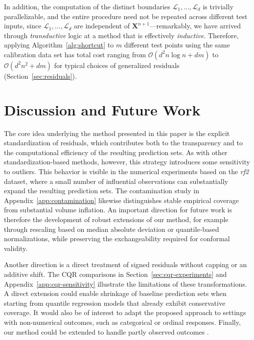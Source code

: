 In addition, the computation of the distinct boundaries $\mathcal{L}_1,\ldots,\mathcal{L}_d$ is trivially parallelizable, and the entire procedure need not be repeated across different test inputs, since $\mathcal{L}_1,\ldots,\mathcal{L}_d$ are independent of $\mathbf{X}^{n+1}$---remarkably, we have arrived through {\em transductive} logic at a method that is effectively {\em inductive}. Therefore, applying Algorithm~\ref{alg:shortcut} to $m$ different test points using the same calibration data set has total cost ranging from $\mathcal{O}(d^2 n \log n + dm)$ to $\mathcal{O}(d^2 n^2 + dm)$ for typical choices of generalized residuals (Section~\ref{sec:residuals}).





\section{Discussion and Future Work}
\label{sec:discussion}

The core idea underlying the method presented in this paper is the explicit standardization of residuals, which contributes both to the transparency and to the computational efficiency of the resulting prediction sets. As with other standardization-based methods, however, this strategy introduces some sensitivity to outliers. This behavior is visible in the numerical experiments based on the \emph{rf2} dataset, where a small number of influential observations can substantially expand the resulting prediction sets. The contamination study in Appendix~\ref{app:contamination} likewise distinguishes stable empirical coverage from substantial volume inflation. An important direction for future work is therefore the development of robust extensions of our method, for example through rescaling based on median absolute deviation or quantile-based normalizations, while preserving the exchangeability required for conformal validity.

Another direction is a direct treatment of signed residuals without capping or an additive shift. The CQR comparisons in Section~\ref{sec:cqr-experiments} and Appendix~\ref{app:cqr-sensitivity} illustrate the limitations of these transformations. A direct extension could enable shrinkage of baseline prediction sets when starting from quantile regression models that already exhibit conservative coverage. It would also be of interest to adapt the proposed approach to settings with non-numerical outcomes, such as categorical or ordinal responses. Finally, our method could be extended to handle partly observed outcomes \citep{braun2025multivariate}.

